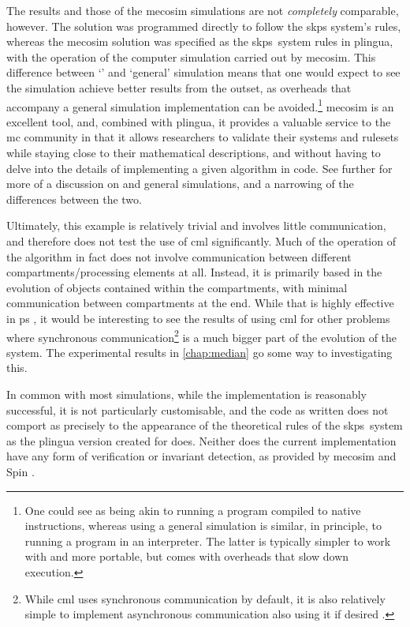 The \fsharp{} results and those of the \gls{mecosim} simulations are not \emph{completely} comparable, however.  The \fsharp{} solution was programmed directly to follow the \gls{skps} system's rules, whereas the \gls{mecosim} solution was specified as the \gls{skps}~system rules in \gls{plingua}, with the operation of the computer simulation carried out by \gls{mecosim}.  This difference between `\adhoc{}' and `general' simulation means that one would expect to see the \fsharp{} simulation achieve better results from the outset, as overheads that accompany a general simulation implementation can be avoided.\footnote{One could see \adhoc{} as being akin to running a program compiled to native instructions, whereas using a general simulation is similar, in principle, to running a program in an interpreter.  The latter is typically simpler to work with and more portable, but comes with overheads that slow down execution.}  \Gls{mecosim} is an excellent tool, and, combined with \gls{plingua}, it provides a valuable service to the \gls{mc} community in that it allows researchers to validate their systems and \glspl{ruleset} while staying close to their mathematical descriptions, and without having to delve into the details of implementing a given algorithm in code.  See further \cite{Perez-Hurtado2019} for more of a discussion on \adhoc{} and general simulations, and a narrowing of the differences between the two.

Ultimately, this example is relatively trivial and involves little communication, and therefore does not test the use of \gls{cml} significantly.  Much of the operation of the algorithm in fact does not involve communication between different compartments/processing elements at all.  Instead, it is primarily based in the evolution of objects contained within the compartments, with minimal communication between compartments at the end.  While that is highly effective in \gls{ps} \cite{Paun2008}, it would be interesting to see the results of using \gls{cml} for other problems where synchronous communication\footnote{While \gls{cml} uses synchronous communication by default, it is also relatively simple to implement asynchronous communication also using it if desired \cite{Reppy2007}.} is a much bigger part of the evolution of the system.  The experimental results in \cref{chap:median} go some way to investigating this.

In common with most \adhoc{} simulations, while the implementation is reasonably successful, it is not particularly customisable, and the code as written does not comport as precisely to the appearance of the theoretical rules of the \gls{skps}~system as the \gls{plingua} version created for \cite{Gheorghe2013} does.  Neither does the current implementation have any form of verification or invariant detection, as provided by \gls{mecosim} \cite{Perez-Hurtado2010} and Spin \cite{Ben-Ari2008,Lefticaru2011}.

